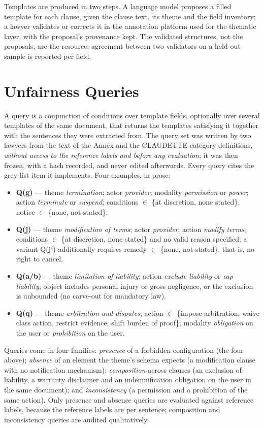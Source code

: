 \documentclass{IOS-Book-Article}
\newcommand{\corpus}{CLAUDETTE}
\begin{document}
Templates are produced in two steps. A language model proposes a filled template for each clause, given the clause text, its theme and the field inventory; a lawyer validates or corrects it in the annotation platform used for the thematic layer, with the proposal's provenance kept. The validated structures, not the proposals, are the resource; agreement between two validators on a held-out sample is reported per field.

\section{Unfairness Queries}
\label{sec:queries}
A query is a conjunction of conditions over template fields, optionally over several templates of the same document, that returns the templates satisfying it together with the sentences they were extracted from. The query set was written by two lawyers from the text of the Annex and the \corpus{} category definitions, \emph{without access to the reference labels and before any evaluation}; it was then frozen, with a hash recorded, and never edited afterwards. Every query cites the grey-list item it implements. Four examples, in prose:

\begin{itemize}
\item \textbf{Q(g)} --- theme \emph{termination}; actor \emph{provider}; modality \emph{permission} or \emph{power}; action \emph{terminate} or \emph{suspend}; conditions $\in$ \{at discretion, none stated\}; notice $\in$ \{none, not stated\}.
\item \textbf{Q(j)} --- theme \emph{modification of terms}; actor \emph{provider}; action \emph{modify terms}; conditions $\in$ \{at discretion, none stated\} and no valid reason specified; a variant Q(j$'$) additionally requires remedy $\in$ \{none, not stated\}, that is, no right to cancel.
\item \textbf{Q(a/b)} --- theme \emph{limitation of liability}; action \emph{exclude liability} or \emph{cap liability}; object includes personal injury or gross negligence, or the exclusion is unbounded (no carve-out for mandatory law).
\item \textbf{Q(q)} --- theme \emph{arbitration and disputes}; action $\in$ \{impose arbitration, waive class action, restrict evidence, shift burden of proof\}; modality \emph{obligation} on the user or \emph{prohibition} on the user.
\end{itemize}

Queries come in four families: \emph{presence} of a forbidden configuration (the four above); \emph{absence} of an element the theme's schema expects (a modification clause with no notification mechanism); \emph{composition} across clauses (an exclusion of liability, a warranty disclaimer and an indemnification obligation on the user in the same document); and \emph{inconsistency} (a permission and a prohibition of the same action). Only presence and absence queries are evaluated against reference labels, because the reference labels are per sentence; composition and inconsistency queries are audited qualitatively.
\end{document}
